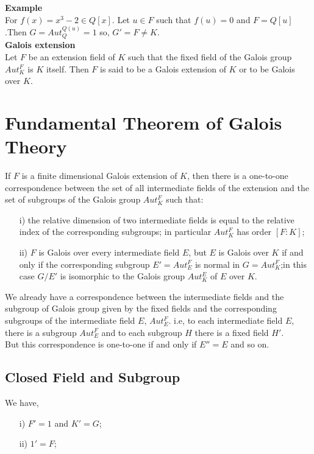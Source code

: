 \textbf{Example}\\
For \(f(x)=x^3-2 \in Q[x]\). Let \(u \in F\) such that \(f(u)=0\) and \(F=Q[u]\).Then
\(G=Aut_Q^{Q(u)}={1}\) so, \(G'=F \neq K\).\\[2mm]

\textbf{Galois extension}\\
Let \(F\) be an extension field of \(K\) such that the fixed field of the Galois group \(Aut_K^F\) is \(K\) itself. Then \(F\) is said to be a Galois extension of \(K\) or to be Galois over \( K\).

\section{Fundamental Theorem of Galois Theory}

If \(F\) is a finite dimensional Galois extension of \(K\), then there is a one-to-one correspondence between the set of all intermediate fields of the extension and the set of subgroups of the Galois group \(Aut_K^F\) such that:
\begin{enumerate}
\item[i)] the relative dimension of two intermediate fields is equal to the relative index of the corresponding subgroups; in particular \(Aut_K^F\) has order \([F:K]\);
  \item[ii)] \(F\) is Galois over every intermediate field \(E\), but \(E\) is Galois over \(K\) if and only if the corresponding subgroup \(E'= Aut_E^F\) is normal in \(G=Aut_K^F\);in this case \(G/E'\) is isomorphic to the Galois group \(Aut_K^E\) of \(E\) over \(K\).
  \end{enumerate}

  We already have a correspondence between the intermediate fields and the subgroup of Galois group given by the fixed fields and the corresponding subgroups of the intermediate field \(E\), \(Aut_E^F\).
  i.e, to each intermediate field \(E\), there is a subgroup \(Aut_E^F\) and to each subgroup \(H\) there is a fixed field \(H'\).\\[2mm]
  But this correspondence is one-to-one if and only if \(E''=E\) and so on.

  \subsection{Closed Field and Subgroup}
  We have,
  \begin{enumerate}
  \item[i)] \(F'=1\) and \(K'=G\);
  \item[ii)] \(1'=F\);
    \end{enumerate}

